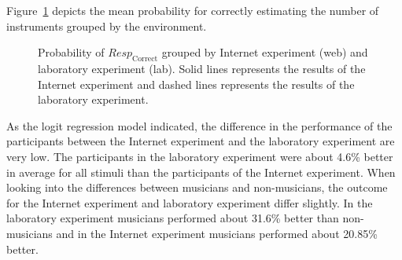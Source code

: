 Figure~\ref{figure:error_probability_iis_vs_web} depicts the mean probability for correctly estimating the number of instruments grouped by the environment.
\begin{figure}[t]
\centering
{}
\caption{Probability of $\textit{Resp}_{\mathrm{Correct}}$ grouped by Internet experiment (web) and laboratory experiment (lab). Solid lines represents the results of the Internet experiment and dashed lines represents the results of the laboratory experiment.}
\label{figure:error_probability_iis_vs_web}
\end{figure}
As the logit regression model indicated, the difference in the performance of the participants between the Internet experiment and the laboratory experiment are very low. The participants in the laboratory experiment were about 4.6\% better in average for all stimuli than the participants of the Internet experiment. When looking into the differences between musicians and non-musicians, the outcome for the Internet experiment and laboratory experiment differ slightly. In the laboratory experiment musicians performed about 31.6\% better than non-musicians and in the Internet experiment musicians performed about 20.85\% better.
